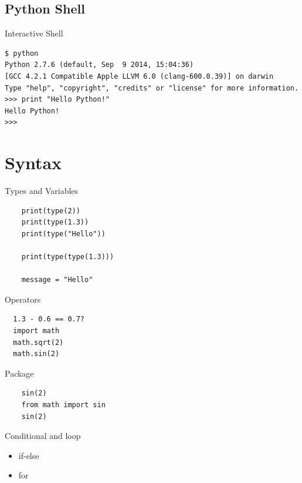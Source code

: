 \documentclass[UTF8]{beamer}
\begin{document}
\subsection{Python Shell}
\begin{frame}[t, fragile]{Interactive Shell}
  \begin{verbatim}
$ python
Python 2.7.6 (default, Sep  9 2014, 15:04:36)
[GCC 4.2.1 Compatible Apple LLVM 6.0 (clang-600.0.39)] on darwin
Type "help", "copyright", "credits" or "license" for more information.
>>> print "Hello Python!"
Hello Python!
>>>
  \end{verbatim}
\end{frame}




\section{Syntax}

\begin{frame}[t, fragile]{Types and Variables}
  \begin{verbatim}
    print(type(2))
    print(type(1.3))
    print(type("Hello"))

    print(type(type(1.3)))

    message = "Hello"
  \end{verbatim}
\end{frame}

\begin{frame}[t, fragile]{Operators}
\begin{verbatim}
  1.3 - 0.6 == 0.7?
  import math
  math.sqrt(2)
  math.sin(2)
\end{verbatim}
\end{frame}

\begin{frame}[t, fragile]{Package}
  \begin{verbatim}
    sin(2)
    from math import sin
    sin(2)
  \end{verbatim}
\end{frame}

\begin{frame}[t]{Conditional and loop}
  \begin{itemize}
    \item if-else
    \item for
  \end{itemize}
\end{frame}
\end{document}
